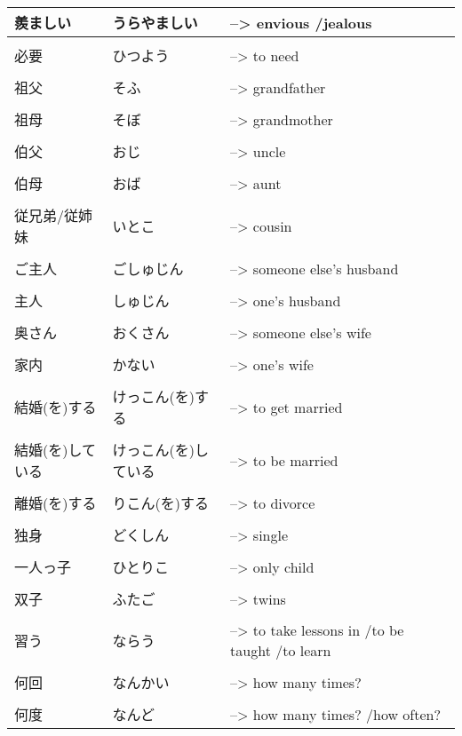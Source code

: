 \documentclass{article}
\begin{document}
\begin{tabular}{ p{3cm} | l l }
羨ましい    &うらやましい       &--> envious /jealous \\ \hline\\[-1em]
必要&ひつよう&--> to need \\ \hline\\[-1em]
祖父&そふ&--> grandfather \\ \hline\\[-1em]
祖母&そぼ&--> grandmother \\ \hline\\[-1em]
伯父&おじ&--> uncle \\ \hline\\[-1em]
伯母&おば&--> aunt \\ \hline\\[-1em]
従兄弟/従姉妹&いとこ&--> cousin \\ \hline\\[-1em]
ご主人&ごしゅじん&--> someone else's husband \\ \hline\\[-1em]
主人&しゅじん&--> one's husband \\ \hline\\[-1em]
奥さん&おくさん&--> someone else's wife \\ \hline\\[-1em]
家内&かない&--> one's wife \\ \hline\\[-1em]
結婚(を)する&けっこん(を)する&--> to get married \\ \hline\\[-1em]
結婚(を)している&けっこん(を)している&--> to be married \\ \hline\\[-1em]
離婚(を)する&りこん(を)する&--> to divorce \\ \hline\\[-1em]
独身&どくしん&--> single \\ \hline\\[-1em] 
一人っ子&ひとりこ&--> only child \\ \hline\\[-1em]
双子&ふたご&--> twins \\ \hline\\[-1em]
習う&ならう&--> to take lessons in /to be taught /to learn \\ \hline\\[-1em]
何回&なんかい&--> how many times? \\ \hline\\[-1em]
何度&なんど&--> how many times? /how often? %
\end{tabular}
\end{document}
